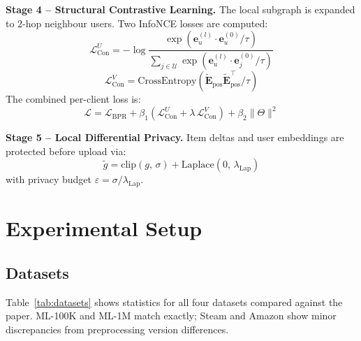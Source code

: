 \documentclass[10pt,twocolumn]{article}
\begin{document}
\noindent\textbf{Stage 4 -- Structural Contrastive Learning.}
The local subgraph is expanded to 2-hop neighbour users. Two InfoNCE
losses are computed:
\begin{equation}
  \mathcal{L}_{\mathrm{Con}}^U = -\log \frac{
    \exp\!\left(\mathbf{e}_u^{(l)} \cdot \mathbf{e}_u^{(0)} / \tau\right)
  }{
    \sum_{j \in \mathcal{U}}
    \exp\!\left(\mathbf{e}_u^{(l)} \cdot \mathbf{e}_j^{(0)} / \tau\right)
  }
  \label{eq:user_cl}
\end{equation}
\begin{equation}
  \mathcal{L}_{\mathrm{Con}}^V =
    \mathrm{CrossEntropy}\!\left(
      \tilde{\mathbf{E}}_{\mathrm{pos}}
      \tilde{\mathbf{E}}_{\mathrm{pos}}^\top / \tau
    \right)
  \label{eq:item_cl}
\end{equation}
The combined per-client loss is:
\begin{equation}
  \mathcal{L} = \mathcal{L}_{\mathrm{BPR}}
    + \beta_1\!\left(\mathcal{L}_{\mathrm{Con}}^U
      + \lambda\,\mathcal{L}_{\mathrm{Con}}^V\right)
    + \beta_2 \|\Theta\|^2
\end{equation}

\noindent\textbf{Stage 5 -- Local Differential Privacy.}
Item deltas and user embeddings are protected before upload via:
\begin{equation}
  \tilde{g} = \mathrm{clip}(g,\,\sigma)
    + \mathrm{Laplace}(0,\,\lambda_{\mathrm{Lap}})
  \label{eq:ldp}
\end{equation}
with privacy budget $\varepsilon = \sigma / \lambda_{\mathrm{Lap}}$.

\section{Experimental Setup}
\label{sec:setup}

\subsection{Datasets}

Table~\ref{tab:datasets} shows statistics for all four datasets compared
against the paper. ML-100K and ML-1M match exactly; Steam and Amazon
show minor discrepancies from preprocessing version differences.
\end{document}
